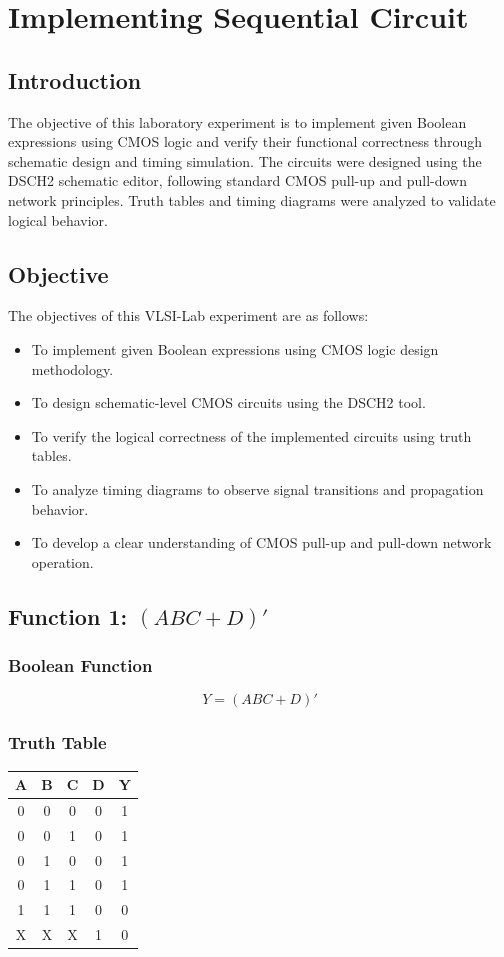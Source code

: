 \documentclass[12pt,a4paper]{report}
\begin{document}
\chapter{Implementing Sequential Circuit}
\section*{Introduction}
The objective of this laboratory experiment is to implement given Boolean expressions using CMOS logic and verify their functional correctness through schematic design and timing simulation. The circuits were designed using the DSCH2 schematic editor, following standard CMOS pull-up and pull-down network principles. Truth tables and timing diagrams were analyzed to validate logical behavior.


\section*{Objective}
The objectives of this VLSI-Lab experiment are as follows:
\begin{itemize}
    \item To implement given Boolean expressions using CMOS logic design methodology.
    \item To design schematic-level CMOS circuits using the DSCH2 tool.
    \item To verify the logical correctness of the implemented circuits using truth tables.
    \item To analyze timing diagrams to observe signal transitions and propagation behavior.
    \item To develop a clear understanding of CMOS pull-up and pull-down network operation.
\end{itemize}

\section{Function 1: $(ABC + D)'$}

\subsection*{Boolean Function}
\[
Y = (ABC + D)'
\]

\subsection*{Truth Table}
\begin{center}
\begin{tabular}{|c|c|c|c|c|}
\hline 
A & B & C & D & Y \\ \hline
0 & 0 & 0 & 0 & 1 \\
0 & 0 & 1 & 0 & 1 \\
0 & 1 & 0 & 0 & 1 \\
0 & 1 & 1 & 0 & 1 \\
1 & 1 & 1 & 0 & 0 \\
X & X & X & 1 & 0 \\ \hline
\end{tabular}
\end{center}
\end{document}
